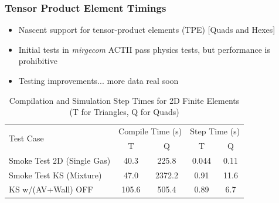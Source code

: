 \begin{frame}[fragile]\frametitle{Tensor Product Element Timings}

  \begin{itemize}
  \item Nascent support for tensor-product elements (TPE) [Quads and Hexes]
  \item Initial tests in \textit{mirgecom} ACTII pass physics tests, but performance is prohibitive
  \item Testing improvements... more data real soon
  \end{itemize}
\begin{table}
\centering
\begin{tabular}{|l|c|c|c|c|}
\hline
\multirow{2}{*}{Test Case} & \multicolumn{2}{c|}{Compile Time (s)} & \multicolumn{2}{c|}{Step Time (s)} \\ \cline{2-5} 
                           & T       & Q      & T       & Q       \\ \hline
Smoke Test 2D (Single Gas) & 40.3    & 225.8  & 0.044   & 0.11    \\ \hline
Smoke Test KS (Mixture)    & 47.0    & 2372.2 & 0.91    & 11.6    \\ \hline
KS w/(AV+Wall) OFF         & 105.6   & 505.4  & 0.89    & 6.7     \\ \hline
\end{tabular}
\caption{Compilation and Simulation Step Times for 2D Finite Elements (T for Triangles, Q for Quads)}
\end{table}

\end{frame}
